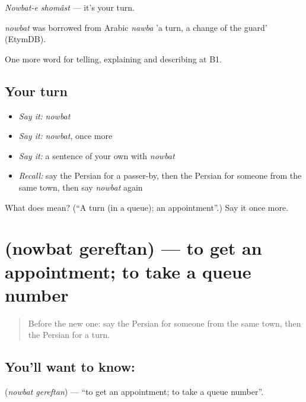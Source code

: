 \emph{Nowbat-e shomâst} — it's your turn.

\begin{cousinweb}
\emph{nowbat} was borrowed from Arabic \emph{nawba} 'a turn, a change of the guard' (EtymDB).
\end{cousinweb}

\begin{grammarlens}[title={What you've built}]
One more word for telling, explaining and describing at B1.
\end{grammarlens}

\subsection*{Your turn}
\begin{itemize}
\raggedright
  \item \emph{Say it:} \emph{nowbat}
  \item \emph{Say it:} \emph{nowbat}, once more
  \item \emph{Say it:} a sentence of your own with \emph{nowbat}
  \item \emph{Recall:} say the Persian for a passer-by, then the Persian for someone from the same town, then say \emph{nowbat} again
\end{itemize}

\begin{tcolorbox}[breakable,colback=teal!4,colframe=teal!35!black,title={Before you move on}]
What does  mean? (\textquotedblleft{}A turn (in a queue); an appointment\textquotedblright{}.) Say it once more.
\end{tcolorbox}
\section[\texorpdfstring{\fa{نوبت} \fa{گرفتن} (nowbat gereftan)}{نوبت گرفتن (nowbat gereftan)}]{  (nowbat gereftan) — to get an appointment; to take a queue number}

\label{lesson:FA-C452-nobat-gereftan}



\begin{quote}
Before the new one: say the Persian for someone from the same town, then the Persian for a turn.
\end{quote}

\subsection*{You'll want to know:  }
\textbf{ } (\emph{nowbat gereftan}) — \textquotedblleft{}to get an appointment; to take a queue number\textquotedblright{}.

